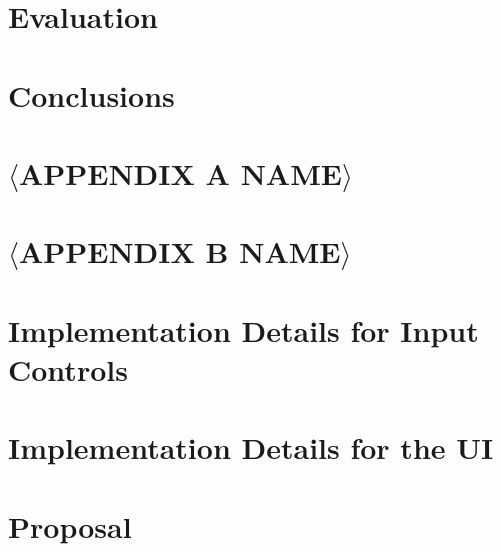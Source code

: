 \documentclass[12pt,a4paper,twoside,openright]{report}
\begin{document}
\chapter{Evaluation}


\chapter{Conclusions}



\newpage

\printbibliography


\appendix


\chapter{\(\langle\)APPENDIX A NAME\(\rangle\)}



\newpage

\chapter{\(\langle\)APPENDIX B NAME\(\rangle\)}



\newpage

\chapter{Implementation Details for Input Controls}



\newpage

\chapter{Implementation Details for the UI}



\newpage

\chapter{Proposal}



\end{document}

